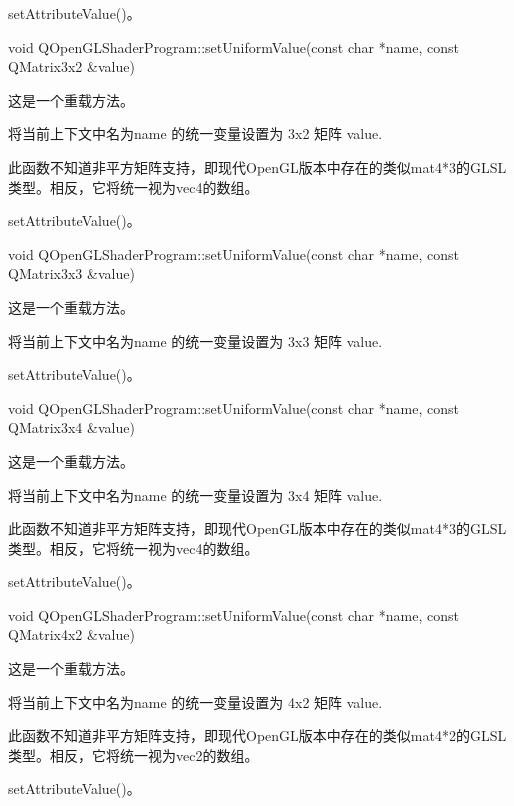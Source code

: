 \begin{seeAlso}
setAttributeValue()。
\end{seeAlso}

void QOpenGLShaderProgram::setUniformValue(const char *name, const QMatrix3x2 \&value)

这是一个重载方法。

将当前上下文中名为name 的统一变量设置为 3x2 矩阵 value.


\begin{notice}
此函数不知道非平方矩阵支持，即现代OpenGL版本中存在的类似mat4*3的GLSL类型。相反，它将统一视为vec4的数组。
\end{notice}


\begin{seeAlso}
setAttributeValue()。
\end{seeAlso}

void QOpenGLShaderProgram::setUniformValue(const char *name, const QMatrix3x3 \&value)

这是一个重载方法。

将当前上下文中名为name 的统一变量设置为 3x3 矩阵 value.

\begin{seeAlso}
setAttributeValue()。
\end{seeAlso}

void QOpenGLShaderProgram::setUniformValue(const char *name, const QMatrix3x4 \&value)

这是一个重载方法。

将当前上下文中名为name 的统一变量设置为 3x4 矩阵 value.

\begin{notice}
此函数不知道非平方矩阵支持，即现代OpenGL版本中存在的类似mat4*3的GLSL类型。相反，它将统一视为vec4的数组。
\end{notice}

\begin{seeAlso}
setAttributeValue()。
\end{seeAlso}

void QOpenGLShaderProgram::setUniformValue(const char *name, const QMatrix4x2 \&value)

这是一个重载方法。

将当前上下文中名为name 的统一变量设置为 4x2 矩阵 value.


\begin{notice}
此函数不知道非平方矩阵支持，即现代OpenGL版本中存在的类似mat4*2的GLSL类型。相反，它将统一视为vec2的数组。
\end{notice}


\begin{seeAlso}
setAttributeValue()。
\end{seeAlso}

